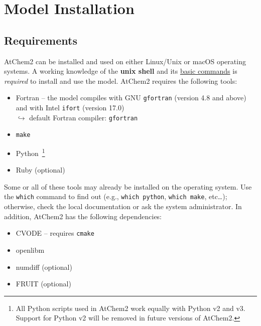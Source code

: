 %
%
%
%

\chapter{Model Installation} \label{ch:installation}

\section{Requirements} \label{sec:requirements}

AtChem2 can be installed and used on either Linux/Unix or macOS
operating systems. A working knowledge of the \textbf{unix shell} and
its \href{https://swcarpentry.github.io/shell-novice/}{basic commands}
is \emph{required} to install and use the model. AtChem2 requires the
following tools:

\begin{itemize}
\item Fortran -- the model compiles with GNU \texttt{gfortran}
  (version 4.8 and above) and with Intel \texttt{ifort} (version 17.0)\\
  $\hookrightarrow$ default Fortran compiler: \texttt{gfortran}
\item \texttt{make}
\item Python~\footnote{All Python scripts used in AtChem2 work equally
  with Python v2 and v3. Support for Python v2 will be removed in
  future versions of AtChem2.}
\item Ruby (optional)
\end{itemize}

Some or all of these tools may already be installed on the operating
system. Use the \texttt{which} command to find out (e.g.,
\verb|which python|, \verb|which make|, etc\ldots); otherwise, check
the local documentation or ask the system administrator. In addition,
AtChem2 has the following dependencies:

\begin{itemize}
\item CVODE -- requires \texttt{cmake}
\item openlibm
\item numdiff (optional)
\item FRUIT (optional)
\end{itemize}

